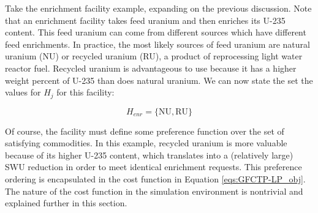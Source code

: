 Take the enrichment facility example, expanding on the previous discussion. Note
that an enrichment facility takes feed uranium and then enriches its U-235
content. This feed uranium can come from different sources which have different
feed enrichments. In practice, the most likely sources of feed uranium are
natural uranium (NU) or recycled uranium (RU), a product of reprocessing light
water reactor fuel. Recycled uranium is advantageous to use because it has a
higher weight percent of U-235 than does natural uranium. We can now state the
set the values for $H_{j}$ for this facility:

\begin{equation}\label{eqs:enr-dem-commods}
  H_{enr} = \{ \mbox{NU}, \mbox{RU} \}
\end{equation}

Of course, the facility must define some preference function over the set of
satisfying commodities. In this example, recycled uranium is more valuable
because of its higher U-235 content, which translates into a (relatively large)
SWU reduction in order to meet identical enrichment requests. This preference
ordering is encapsulated in the cost function in Equation
\ref{eqs:GFCTP-LP_obj}. The nature of the cost function in the \Cyclus
simulation environment is nontrivial and explained further in this section.
